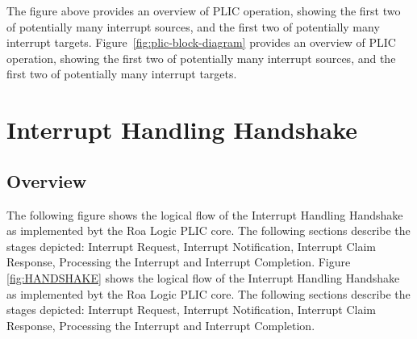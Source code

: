\ifdefined\MARKDOWN
The figure above provides an overview of PLIC operation, showing the first two of potentially many interrupt sources, and the first two of potentially many interrupt targets.
\else
Figure~\ref{fig:plic-block-diagram} provides an overview of PLIC operation, showing the first two of potentially many interrupt sources, and the first two of potentially many interrupt targets.
\fi

\clearpage

\section{Interrupt Handling Handshake}

\subsection{Overview}

\ifdefined\MARKDOWN
The following figure shows the logical flow of the Interrupt Handling Handshake as implemented byt the Roa Logic PLIC core. The following sections describe the stages depicted: Interrupt Request, Interrupt Notification, Interrupt Claim Response, Processing the Interrupt and Interrupt Completion.
\else
Figure \ref{fig:HANDSHAKE} shows the logical flow of the Interrupt Handling Handshake as implemented byt the Roa Logic PLIC core. The following sections describe the stages depicted: Interrupt Request, Interrupt Notification, Interrupt Claim Response, Processing the Interrupt and Interrupt Completion.
\fi


